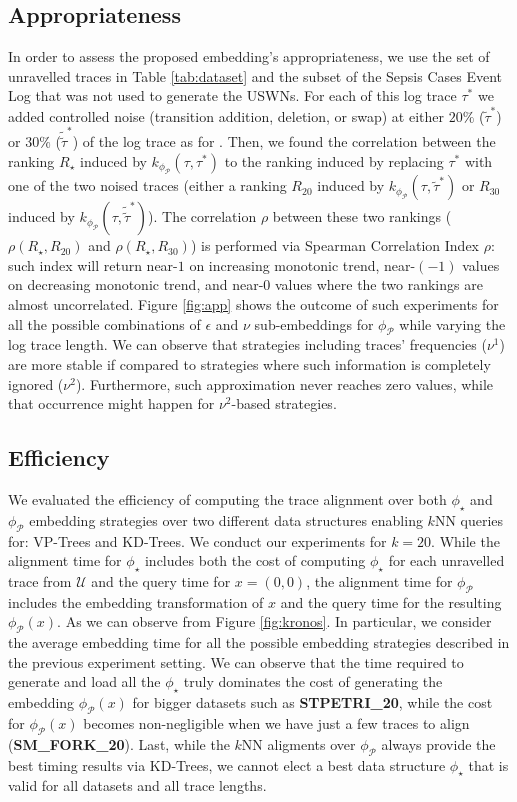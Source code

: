 \subsection{Appropriateness}\label{subsec:apprp}
In order to assess the proposed embedding's appropriateness, we use the set of unravelled traces in Table \ref{tab:dataset} and the subset of the Sepsis Cases Event Log that was not used to generate the USWNs. For each of this log trace $\tau^*$ we added controlled noise (transition addition, deletion, or swap) at either $20\%$ ($\tilde{\tau}^*$) or $30\%$ ($\tilde{\tilde{{\tau}}}^*$) of the log trace as for \cite{LeoniM17}. Then, we found the correlation between the ranking $R_\star$ induced by $k_{\phi_{\mathcal{P}}}(\tau,\tau^*)$ to the ranking induced by replacing $\tau^*$ with one of the two noised traces (either a ranking $R_{20}$ induced by $k_{\phi_{\mathcal{P}}}(\tau,\tilde{\tau}^*)$ or $R_{30}$ induced by $k_{\phi_{\mathcal{P}}}(\tau,\tilde{\tilde{\tau}}^*)$). The correlation $\rho$ between these two rankings ($\rho(R_\star,R_{20})$ and $\rho(R_\star,R_{30})$) is performed via Spearman Correlation Index $\rho$: such index will return near-$1$ on increasing monotonic trend, near-$(-1)$ values on decreasing monotonic trend, and near-$0$ values where the two rankings are almost uncorrelated. Figure \ref{fig:app} shows the outcome of such experiments for all the possible combinations of $\epsilon$ and $\nu$ sub-embeddings for $\phi_{\mathcal{P}}$ while varying the log trace length. We can observe that strategies including traces' frequencies ($\nu^1$) are more stable if compared to strategies where such information is completely ignored ($\nu^2$). Furthermore, such approximation never reaches zero values, while that occurrence might happen for $\nu^2$-based strategies.

\subsection{Efficiency}\label{subsec:efficio}
We evaluated the efficiency of computing the trace alignment over both $\phi_\star$ and $\phi_{\mathcal{P}}$ embedding strategies over two different data structures enabling $k$NN queries for: VP-Trees and KD-Trees. We conduct our experiments for $k=20$. While the alignment time for $\phi_\star$ includes both the cost of computing $\phi_\star$ for each unravelled trace from $\mathcal{U}$ and the query time for $x=(0,0)$, the alignment time for $\phi_{\mathcal{P}}$ includes the embedding transformation of $x$ and the query time for the resulting $\phi_{\mathcal{P}}(x)$. As we can observe from Figure \ref{fig:kronos}. In particular, we consider the average embedding time for all the possible embedding strategies described in the previous experiment setting. We can observe that the time required to generate and load all the $\phi_\star$ truly dominates the cost of generating the embedding $\phi_{\mathcal{P}}(x)$ for bigger datasets such as \textbf{STPETRI\_20}, while the cost for $\phi_{\mathcal{P}}(x)$ becomes non-negligible when we have just a few traces to align (\textbf{SM\_FORK\_20}). Last, while the $k$NN aligments over $\phi_{\mathcal{P}}$ always provide the best timing results via KD-Trees, we cannot elect a best data structure $\phi_\star$ that is valid for all datasets and all trace lengths.